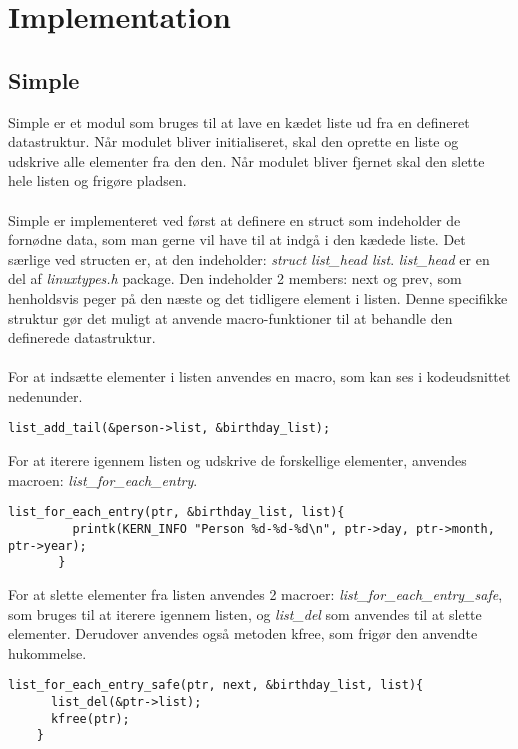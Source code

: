 \chapter{Implementation}
\section{Simple}
Simple er et modul som bruges til at lave en kædet liste ud fra en defineret datastruktur. Når modulet bliver initialiseret, skal den oprette en liste og udskrive alle elementer fra den den. Når modulet bliver fjernet skal den slette hele listen og frigøre pladsen.
\\\\
Simple er implementeret ved først at definere en struct som indeholder de fornødne data, som man gerne vil have til at indgå i den kædede liste. Det særlige ved structen er, at den indeholder: \textit{struct list\_head list}. \textit{list\_head} er en del af \textit{linux{types.h}} package. Den indeholder 2 members: next og prev, som henholdsvis peger på den næste og det tidligere element i listen. Denne specifikke struktur gør det muligt at anvende macro-funktioner til at behandle den definerede datastruktur.
\\\\
For at indsætte elementer i listen anvendes en macro, som kan ses i kodeudsnittet nedenunder. 

\begin{lstlisting}
list_add_tail(&person->list, &birthday_list);
\end{lstlisting}

For at iterere igennem listen og udskrive de forskellige elementer, anvendes macroen: \textit{list\_for\_each\_entry}.

\begin{lstlisting}
list_for_each_entry(ptr, &birthday_list, list){
         printk(KERN_INFO "Person %d-%d-%d\n", ptr->day, ptr->month, ptr->year);
       }
\end{lstlisting}

For at slette elementer fra listen anvendes 2 macroer: \textit{list\_for\_each\_entry\_safe}, som bruges til at iterere igennem listen, og \textit{list\_del} som anvendes til at slette elementer. Derudover anvendes også metoden kfree, som frigør den anvendte hukommelse.

\begin{lstlisting}
list_for_each_entry_safe(ptr, next, &birthday_list, list){
	  list_del(&ptr->list);
	  kfree(ptr);
	}
\end{lstlisting}


